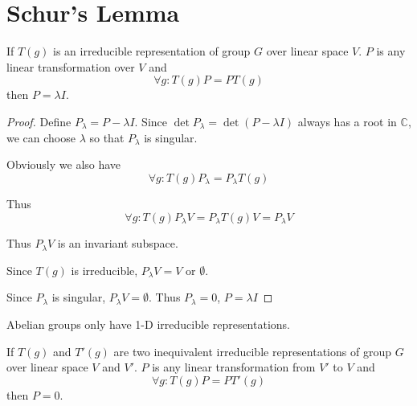 \documentclass[12pt]{book}
\begin{document}
	\section{Schur's Lemma}
	\begin{lemma}[Schur]
		If $T(g)$ is an irreducible representation of group $G$ over linear space $V$. $P$ is any linear transformation over $V$ and
		\begin{equation}
			\forall g:T(g)P=PT(g)
		\end{equation}
		then $P=\lambda I$.
	\end{lemma}
	\begin{proof}
		Define $P_\lambda=P-\lambda I$. Since $\det P_\lambda=\det(P-\lambda I)$ always has a root in $\mathbb C$, we can choose $\lambda$ so that $P_\lambda$ is singular.
		
		Obviously we also have
		\begin{equation}
			\forall g:T(g)P_\lambda=P_\lambda T(g)
		\end{equation}
		
		Thus
		\begin{equation}
		\forall g:T(g)P_\lambda V=P_\lambda T(g)V=P_\lambda V
		\end{equation}
		
		Thus $P_\lambda V$ is an invariant subspace.
		
		Since $T(g)$ is irreducible, $P_\lambda V=V$ or $\emptyset$.
		
		Since $P_\lambda$ is singular, $P_\lambda V=\emptyset$. Thus $P_\lambda=0$, $P=\lambda I$
	\end{proof}
	\begin{corollary}
		Abelian groups only have 1-D irreducible representations.
	\end{corollary}
	\begin{lemma}[Schur]
		If $T(g)$ and $T'(g)$ are two inequivalent irreducible representations of group $G$ over linear space $V$ and $V'$. $P$ is any linear transformation from $V'$ to $V$ and
		\begin{equation}
			\forall g:T(g)P=PT'(g)
		\end{equation}
		then $P=0$.
	\end{lemma}
\end{document}
